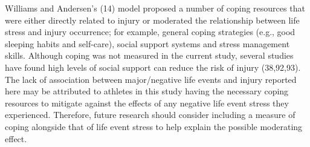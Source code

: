 \documentclass[
  english,
  man]{apa6}
\begin{document}
Williams and Andersen's (14) model proposed a number of coping resources that were either directly related to injury or moderated the relationship between life stress and injury occurrence; for example, general coping strategies (e.g., good sleeping habits and self-care), social support systems and stress management skills.
Although coping was not measured in the current study, several studies have found high levels of social support can reduce the risk of injury (38,92,93).
The lack of association between major/negative life events and injury reported here may be attributed to athletes in this study having the necessary coping resources to mitigate against the effects of any negative life event stress they experienced.
Therefore, future research should consider including a measure of coping alongside that of life event stress to help explain the possible moderating effect.
\end{document}
